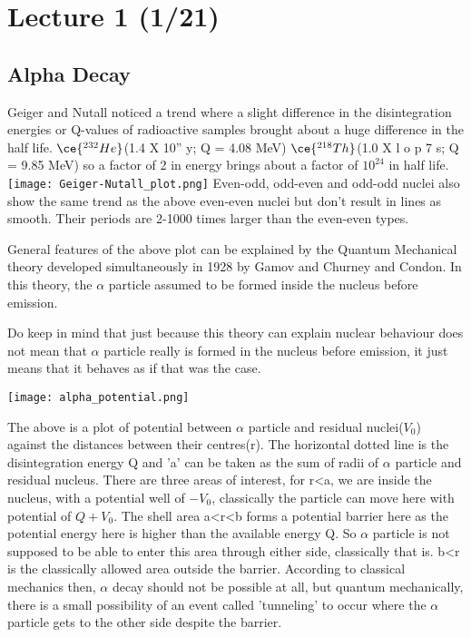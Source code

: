 
\section[Lecture 1 -- {\it Alpha Particle}]{Lecture 1 (1/21)}

\subsection{Alpha Decay}
Geiger and Nutall noticed a trend where a slight difference in the disintegration energies or Q-values
of radioactive samples brought about a huge difference in the half life. $\ce{^{232}He}$(1.4 X 10” y; Q = 4.08 MeV) $\ce{^{218}Th}$(1.0 X l o p 7 s; Q = 9.85 MeV)
so a factor of 2 in energy brings about a factor of $10^24$ in half life. 
\texttt{[image: Geiger-Nutall\_plot.png]}
Even-odd, odd-even and odd-odd nuclei also show the same trend as the above even-even nuclei but 
don't result in lines as smooth. Their periods are 2-1000 times larger than the even-even types.

General features of the above plot can be explained by the Quantum Mechanical theory developed simultaneously 
in 1928 by Gamov and Churney and Condon. In this theory, the $\alpha$ particle assumed to be formed inside
the nucleus before emission. 

Do keep in mind that just because this theory can explain nuclear behaviour
does not mean that $\alpha$ particle really is formed in the nucleus before emission, it just means that 
it behaves as if that was the case.

\texttt{[image: alpha\_potential.png]}

The above is a plot of potential between $\alpha$ particle and residual nuclei($V_{0}$) against the distances 
between their centres(r). The horizontal dotted line is the disintegration energy Q and 'a' can be taken as the sum of radii of $\alpha$ particle and residual nucleus.
There are three areas of interest, for r<a, we are inside the nucleus, with a potential well of $-V_{0}$, classically the particle can move 
here with potential of $Q+V_{0}$. The shell area a<r<b forms a potential barrier here as the potential
energy here is higher than the available energy Q. So $\alpha$ particle is not supposed to be able to 
enter this area through either side, classically that is. b<r is the classically allowed area outside the barrier.
According to classical mechanics then, $\alpha$ decay should not be possible at all, but quantum mechanically, there 
is a small possibility of an event called 'tunneling' to occur where the $\alpha$ particle gets to the 
other side despite the barrier. 

